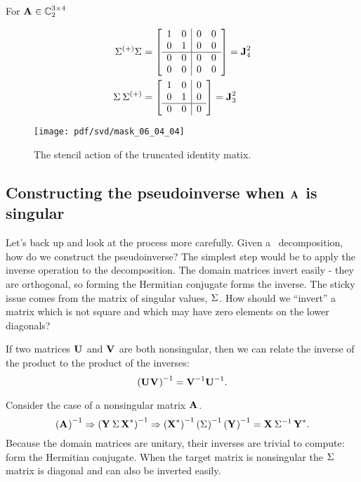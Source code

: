 For $\A{}\in\cmplx{\by{3}{4}}_{2}$

\begin{equation}
  \begin{split}
  \sig{(+)}\sig{} &= 
  \mat{cc|cc}{1&0&0&0\\0&1&0&0\\\hline0&0&0&0\\0&0&0&0} = \J{4}{2} \\
  \sig{}\,\sig{(+)} &= 
  \mat{cc|c}{1&0&0\\0&1&0\\\hline0&0&0} = \J{3}{2}
  \end{split}
\end{equation}

\begin{figure}[htbp] %
   \centering
   \texttt{[image: pdf/svd/mask\_06\_04\_04]} 
   \caption{The stencil action of the truncated identity matix.}
   \label{fig:svd:stencil}
\end{figure}

\subsection[Construction: general case]{Constructing the pseudoinverse when $\A{}$ is singular}
Let's back up and look at the process more carefully.
Given a \svdl \ decomposition, how do we construct the pseudoinverse? The simplest step would be to apply the inverse operation to the decomposition. The domain matrices invert easily - they are orthogonal, so forming the Hermitian conjugate forms the inverse. The sticky issue comes from the matrix of singular values, $\sig{}$. How should we ``invert'' a matrix which is not square and which may have zero elements on the lower diagonals?

If two matrices $\U{}$ and $\V{}$ are both nonsingular, then we can relate the inverse of the product to the product of the inverses:
\begin{equation}
  \paren{\U{}\V{}}^{-1} = \V{-1}\U{-1}.
\end{equation}

Consider the case of a nonsingular matrix $\A{}$.
\begin{equation}
  \paren{\A{}}^{-1} \Rightarrow \paren{\svd{*}}^{-1} \Rightarrow \paren{\X{*}}^{-1}\paren{\sig{}}^{-1}\paren{\Y{}}^{-1}=\X{}\,\sig{-1}\,\Y{*}.
\end{equation}
Because the domain matrices are unitary, their inverses are trivial to compute: form the Hermitian conjugate. When the target matrix is nonsingular the $\sig{}$ matrix is diagonal and can also be inverted easily.

